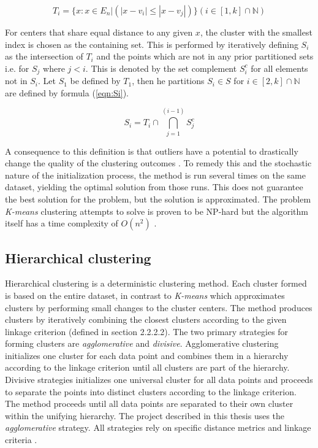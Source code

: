 \begin{equation}
\label{eqn:Ti}
T_i = \{x : x \in E_n | (|x - v_i| \leq |x - v_j|)\} (i \in [1, k] \cap \mathbb{N})
\end{equation}

For centers that share equal distance to any given $x$, the cluster with the smallest index is chosen as the containing set. This is performed by iteratively defining $S_i$ as the intersection of $T_i$ and the points which are not in any prior partitioned sets i.e. for $S_j$ where $j < i$. This is denoted by the set complement $S_i^c$ for all elements not in $S_i$. Let $S_1$ be defined by $T_1$, then he partitions $S_i \in S$ for $i \in [2, k] \cap \mathbb{N}$ are defined by formula (\ref{eqn:Si}).

\begin{equation}
\label{eqn:Si}
S_i = T_i \cap \bigcap_{j=1}^{(i-1)} S_j^c
\end{equation}

A consequence to this definition is that outliers have a potential to drastically change the quality of the clustering outcomes \cite{chawla2013k}. To remedy this and the stochastic nature of the initialization process, the method is run several times on the same dataset, yielding the optimal solution from those runs. This does not guarantee the best solution for the problem, but the solution is approximated. The problem \textit{K-means} clustering attempts to solve is proven to be NP-hard \cite{chawla2013k, mahajan2009planar} but the algorithm itself has a time complexity of $O(n^2)$ \cite{pakhira2014linear}.


\subsection{Hierarchical clustering}

Hierarchical clustering is a deterministic clustering method. Each cluster formed is based on the entire dataset, in contrast to \textit{K-means} which approximates clusters by performing small changes to the cluster centers. The method produces clusters by iteratively combining the closest clusters according to the given linkage criterion (defined in section 2.2.2.2). The two primary strategies for forming clusters are \textit{agglomerative} and \textit{divisive}. Agglomerative clustering initializes one cluster for each data point and combines them in a hierarchy according to the linkage criterion until all clusters are part of the hierarchy. Divisive strategies initializes one universal cluster for all data points and proceeds to separate the points into distinct clusters according to the linkage criterion. The method proceeds until all data points are separated to their own cluster within the unifying hierarchy. The project described in this thesis uses the \textit{agglomerative} strategy. All strategies rely on specific distance metrics and linkage criteria \cite{murtagh1983survey}.

